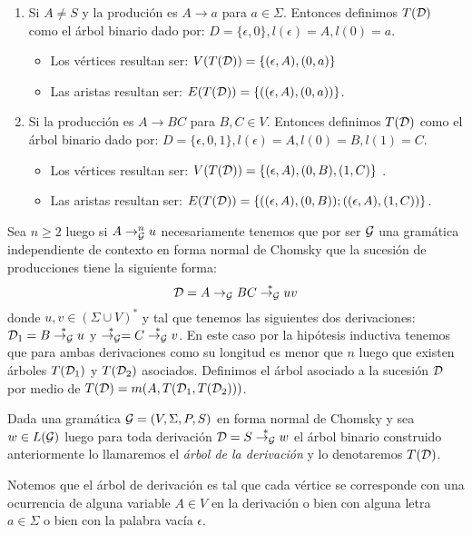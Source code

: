 \documentclass[tesis.tex]{subfiles}
\begin{document}
\begin{leoenv}
\begin{enumerate}
		

	\item Si $A \neq S$ y la produción es $A \to a$ para $a \in \Sigma$.
		Entonces definimos $T({\cal D})$ como el árbol binario dado por:
		$D = \{ \epsilon, 0 \}, l(\epsilon) = A, l(0) = a$.
		\begin{itemize}
			\item Los vértices resultan ser: $V(T({\cal D})) = \{ (\epsilon,A), (0, a) \}$ 
			\item Las aristas resultan ser: $E(T({\cal D})) =\{ ((\epsilon,A), (0, a))\}$.
		\end{itemize}
		

	\item Si la producción es $A \to BC$ para $B,C \in V$.
		Entonces definimos $T({\cal D})$ como el árbol binario dado por:
		$D=\{ \epsilon, 0, 1 \}, l(\epsilon) = A, l(0)=B, l(1) = C$.
		\begin{itemize}
			\item Los vértices resultan ser: $V(T({\cal D})) = \{ (\epsilon,A), (0, B), (1,C) \}$ .
			\item Las aristas resultan ser: $E(T({\cal D})) =\{ ((\epsilon,A), (0, B)); ((\epsilon,A),(1,C))\}$.
		\end{itemize}
\end{enumerate}

Sea $n \ge 2$ luego si $A \to_{{\cal G}}^{n} u$ necesariamente tenemos que por ser ${\cal G}$ una gramática independiente de contexto en forma normal de Chomsky que la sucesión de producciones tiene la siguiente forma:
\begin{equation*}
	{\cal D} = A \to_{{\cal G}} BC \overset{*}{\to_{\cal G}} uv
\end{equation*}
donde $u,v \in (\Sigma \cup V)^{*}$ y tal que tenemos las siguientes dos derivaciones: ${\cal D}_{1} = B \overset{*}{\to_{\cal G}} u$ y $\overset{*}{\to_{\cal G}} = C \overset{*}{\to_{\cal G}} v$.
En este caso por la hipótesis inductiva tenemos que para ambas derivaciones como su longitud es menor que $n$ luego que existen árboles $T({\cal D}_{1})$ y $T({\cal D}_{2})$ asociados.
Definimos el árbol asociado a la sucesión ${\cal D}$ por medio de 
$T({\cal D}) = m(A,T({\cal D}_{1},T({\cal D}_{2})))$.


\begin{deff}
	Dada una gramática ${\cal G} = (V, \Sigma, P, S)$ \ic en forma normal de Chomsky y sea $w \in L({\cal G})$ luego para toda derivación ${\cal D} = S \overset{*}{\to_{\cal G}} w$ el árbol binario construido anteriormente lo llamaremos 
	el \emph{árbol de la derivación} y lo denotaremos $T({\cal D})$.
\end{deff}

Notemos que el árbol de derivación es tal que cada vértice se corresponde con una ocurrencia de alguna variable $A \in V$ en la derivación o bien con alguna letra $a \in \Sigma$ o bien con la palabra vacía $\epsilon$.


\end{leoenv}
\end{document}
